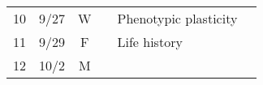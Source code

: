 \documentclass[]{article}
\begin{document}
\begin{longtable}[]{@{}ccclll@{}}
\begin{minipage}[t]{0.13\columnwidth}
10\strut
\end{minipage} & \begin{minipage}[t]{0.08\columnwidth}\centering\strut
9/27\strut
\end{minipage} & \begin{minipage}[t]{0.07\columnwidth}\centering\strut
W\strut
\end{minipage} & \begin{minipage}[t]{0.10\columnwidth}\raggedright\strut
\strut
\end{minipage} & \begin{minipage}[t]{0.12\columnwidth}\raggedright\strut
Phenotypic plasticity\strut
\end{minipage} & \begin{minipage}[t]{0.12\columnwidth}\raggedright\strut
\strut
\end{minipage}\tabularnewline
\begin{minipage}[t]{0.13\columnwidth}\centering\strut
11\strut
\end{minipage} & \begin{minipage}[t]{0.08\columnwidth}\centering\strut
9/29\strut
\end{minipage} & \begin{minipage}[t]{0.07\columnwidth}\centering\strut
F\strut
\end{minipage} & \begin{minipage}[t]{0.10\columnwidth}\raggedright\strut
\strut
\end{minipage} & \begin{minipage}[t]{0.12\columnwidth}\raggedright\strut
Life history\strut
\end{minipage} & \begin{minipage}[t]{0.12\columnwidth}\raggedright\strut
\strut
\end{minipage}\tabularnewline
\begin{minipage}[t]{0.13\columnwidth}\centering\strut
12\strut
\end{minipage} & \begin{minipage}[t]{0.08\columnwidth}\centering\strut
10/2\strut
\end{minipage} & \begin{minipage}[t]{0.07\columnwidth}\centering\strut
M\strut
\end{minipage} & \begin{minipage}[t]{0.10\columnwidth}\raggedright\strut
\strut
\end{minipage} & \begin{minipage}[t]{0.12\columnwidth}\raggedright\strut

\end{minipage}
\end{longtable}
\end{document}
